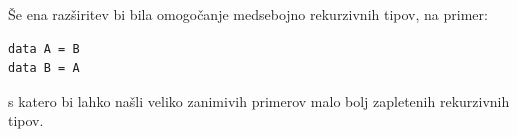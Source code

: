 \documentclass[a4paper,12pt,openright]{book}
\begin{document}
Še ena razširitev bi bila omogočanje medsebojno rekurzivnih tipov, na primer:
\begin{lstlisting}
data A = B
data B = A
\end{lstlisting}
s katero bi lahko našli veliko zanimivih primerov malo bolj zapletenih rekurzivnih tipov.




\raggedright

\printbibliography[heading=bibintoc,title={Literatura}]
\end{document}
